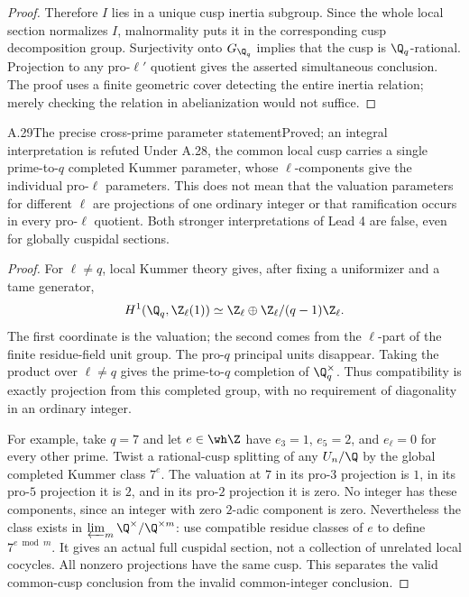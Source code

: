 \begin{proof}
Therefore $I$ lies in a unique cusp inertia subgroup. Since the whole local section normalizes $I$, malnormality puts it in the corresponding cusp decomposition group. Surjectivity onto $G_{\Q_q}$ implies that the cusp is $\Q_q$-rational. Projection to any pro-$\ell'$ quotient gives the asserted simultaneous conclusion. The proof uses a finite geometric cover detecting the entire inertia relation; merely checking the relation in abelianization would not suffice.
\end{proof}

\begin{statement}{A.29}{The precise cross-prime parameter statement}{Proved; an integral interpretation is refuted}
Under A.28, the common local cusp carries a single prime-to-$q$ completed Kummer parameter, whose $\ell$-components give the individual pro-$\ell$ parameters. This does not mean that the valuation parameters for different $\ell$ are projections of one ordinary integer or that ramification occurs in every pro-$\ell$ quotient. Both stronger interpretations of Lead 4 are false, even for globally cuspidal sections.
\end{statement}
\begin{proof}
For $\ell\ne q$, local Kummer theory gives, after fixing a uniformizer and a tame generator,
\[
H^1(\Q_q,\Z_\ell(1))\simeq
\Z_\ell\oplus\Z_\ell/(q-1)\Z_\ell.
\]
The first coordinate is the valuation; the second comes from the $\ell$-part of the finite residue-field unit group. The pro-$q$ principal units disappear. Taking the product over $\ell\ne q$ gives the prime-to-$q$ completion of $\Q_q^\times$. Thus compatibility is exactly projection from this completed group, with no requirement of diagonality in an ordinary integer.

For example, take $q=7$ and let $e\in\wh\Z$ have $e_3=1$, $e_5=2$, and $e_\ell=0$ for every other prime. Twist a rational-cusp splitting of any $U_n/\Q$ by the global completed Kummer class $7^e$. The valuation at $7$ in its pro-$3$ projection is $1$, in its pro-$5$ projection it is $2$, and in its pro-$2$ projection it is zero. No integer has these components, since an integer with zero $2$-adic component is zero. Nevertheless the class exists in $\varprojlim_m\Q^\times/\Q^{\times m}$: use compatible residue classes of $e$ to define $7^{e\bmod m}$. It gives an actual full cuspidal section, not a collection of unrelated local cocycles. All nonzero projections have the same cusp. This separates the valid common-cusp conclusion from the invalid common-integer conclusion.
\end{proof}

